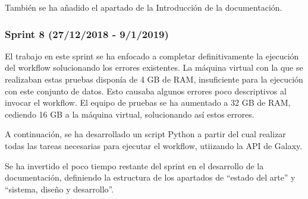También se ha añadido el apartado de la Introducción de la documentación.

\subsubsection{Sprint 8 (27/12/2018 - 9/1/2019)}
El trabajo en este sprint se ha enfocado a completar definitivamente la ejecución del workflow solucionando los errores existentes. La máquina virtual con la que se realizaban estas pruebas disponía de 4 GB de RAM, insuficiente para la ejecución con este conjunto de datos. Esto causaba algunos errores poco descriptivos al invocar el workflow. El equipo de pruebas se ha aumentado a 32 GB de RAM, cediendo 16 GB a la máquina virtual, solucionando así estos errores.

A continuación, se ha desarrollado un script Python a partir del cual realizar todas las tareas necesarias para ejecutar el workflow, utiizando la API de Galaxy.

Se ha invertido el poco tiempo restante del sprint en el desarrollo de la documentación, definiendo la estructura de los apartados de ``estado del arte'' y ``sistema, diseño y desarrollo''.
\newpage \thispagestyle{empty} %